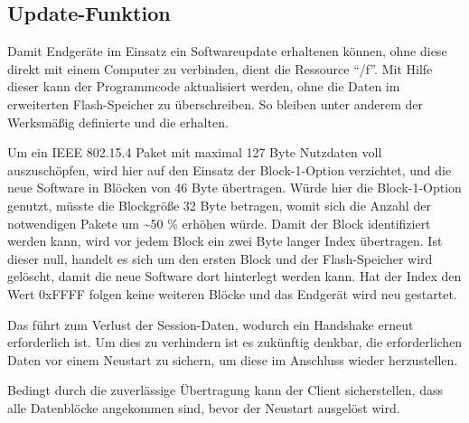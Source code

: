 \subsection{Update-Funktion}

Damit Endgeräte im Einsatz ein Softwareupdate erhaltenen können, ohne diese direkt mit einem Computer zu verbinden,
dient die Ressource "`/f"'. Mit Hilfe dieser kann der Programmcode aktualisiert werden, ohne die Daten im
erweiterten Flash-Speicher zu überschreiben. So bleiben unter anderem der Werksmäßig definierte  und die  erhalten.

Um ein IEEE 802.15.4 Paket mit maximal 127 Byte Nutzdaten voll auszuschöpfen, wird hier auf den Einsatz der Block-1-Option verzichtet, und
die neue Software in Blöcken von 46 Byte übertragen. Würde hier die Block-1-Option genutzt, müsste die Blockgröße 32 Byte betragen, womit
sich die Anzahl der notwendigen Pakete um \textasciitilde 50 \% erhöhen würde. Damit der Block identifiziert werden kann, wird vor jedem Block ein zwei
Byte langer Index übertragen. Ist dieser null, handelt es sich um den ersten Block und der Flash-Speicher wird gelöscht, damit die neue Software
dort hinterlegt werden kann. Hat der Index den Wert $ 0 $xFFFF folgen keine weiteren Blöcke und das Endgerät wird neu gestartet.

Das führt zum Verlust der Session-Daten, wodurch ein Handshake erneut erforderlich ist. Um dies zu verhindern ist es zukünftig denkbar,
die erforderlichen Daten vor einem Neustart zu sichern, um diese im Anschluss wieder herzustellen.

Bedingt durch die zuverlässige Übertragung kann der Client sicherstellen, dass alle Datenblöcke angekommen sind, bevor der Neustart ausgelöst wird.
